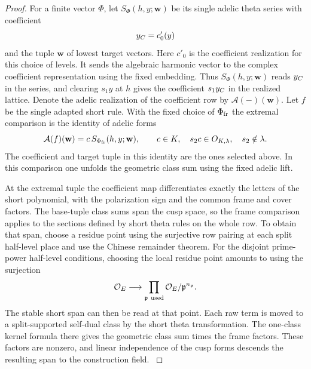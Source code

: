 \begin{proof}
For a finite vector \(\Phi\), let
\(S_\Phi(h,y;\mathbf w)\) be its single adelic theta series
with coefficient 
\[
  y_{C}=c'_0(y)
\]
 and the tuple \(\mathbf w\) of
lowest target vectors. Here \(c'_0\) is the coefficient realization for this choice of levels. It sends the algebraic harmonic vector
to the complex coefficient representation using the fixed embedding.
Thus \(S_\Phi(h,y;\mathbf w)\) reads \(y_{C}\) in the series,
and clearing \(s_1 y\) at \(h\) gives the coefficient
\(s_1 y_{C}\) in the realized lattice. Denote the adelic realization of the coefficient row by \(\mathcal A(-)(\mathbf w)\). Let \(f\) be the single adapted short rule. With the
fixed choice of \(\Phi_{\rm fr}\) the extremal comparison
is the identity of adelic forms
\[
          \mathcal A(f)(\mathbf w)=c\,S_{\Phi_{\rm fr}}(h,y;\mathbf w),
          \qquad c\in K,\quad s_2c\in O_{K,\lambda},\quad s_2\notin\lambda .
\]
The coefficient and target tuple in this identity are the
ones selected above.
In this comparison one unfolds the geometric class sum
using the fixed adelic lift.

At the extremal tuple the
coefficient map differentiates exactly the letters of
the short polynomial, with the polarization sign and the
common frame and cover factors. The base-tuple class sums
span the cusp space, so the frame comparison applies to the sections defined by short theta rules on the whole row. To obtain that
span, choose a residue point using the surjective row
pairing at each split half-level place and use the
Chinese remainder theorem.
For the disjoint prime-power half-level conditions, choosing the local residue point amounts to using the surjection
\[
  {\cal O}_E\longrightarrow\prod_{\mathfrak p\ {\rm used}}{\cal O}_E/\mathfrak p^{n_{\mathfrak p}} .
\]
 The stable short span can
then be read at that point. Each raw term is moved to a
split-supported self-dual class by the short theta
transformation. The one-class kernel formula there gives
the geometric class sum times the frame factors. These
factors are nonzero, and linear independence of the cusp forms
descends the resulting span to the construction field.
\label{cor:paired-off-prime-trace-5}


\end{proof}
